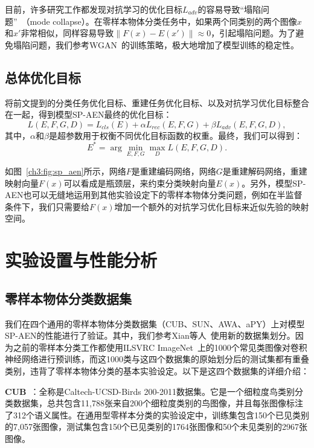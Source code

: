 目前，许多研究工作都发现对抗学习的优化目标$L_{adv}$的容易导致“塌陷问题”~\cite{arjovsky2017wasserstein}（mode collapse）。在零样本物体分类任务中，如果两个同类别的两个图像$x$和$x'$非常相似，同样容易导致$\|F(x)-E(x')\|\approx 0$，引起塌陷问题。为了避免塌陷问题，我们参考WGAN~\cite{arjovsky2017wasserstein}的训练策略，极大地增加了模型训练的稳定性。


\subsection{总体优化目标}
将前文提到的分类任务优化目标、重建任务优化目标、以及对抗学习优化目标整合在一起，得到模型SP-AEN最终的优化目标：
\begin{equation} \label{ch3:eq:eq_5}
L (E, F, G, D) = L_{cls}(E) + \alpha L_{rec} (E, F, G) + \beta L_{adv}(E, F, G, D),
\end{equation}
其中，$\alpha$和$\beta$是超参数用于权衡不同优化目标函数的权重。最终，我们可以得到：
\begin{equation}\label{ch3:eq:eq_6}
E^* = \arg\min\limits_{E, F, G}\max\limits_{D} L(E, F, G, D).
\end{equation}

如图~\ref{ch3:fig:sp_aen}所示，网络$F$是重建编码网络，网络$G$是重建解码网络，重建映射向量$F(x)$可以看成是瓶颈层，来约束分类映射向量$E(x)$。另外，模型SP-AEN也可以无缝地运用到其他实验设定下的零样本物体分类问题，例如在半监督条件下，我们只需要给$F(x)$增加一个额外的对抗学习优化目标来近似先验的映射空间。


\section{实验设置与性能分析}
\subsection{零样本物体分类数据集}

我们在四个通用的零样本物体分类数据集（CUB、SUN、AWA、aPY）上对模型SP-AEN的性能进行了验证。其中，我们参考Xian等人~\cite{xian2017zero}使用新的数据集划分。因为之前的零样本分类工作都使用ILSVRC ImageNet~\cite{russakovsky2015imagenet}上的1000个常见类图像对卷积神经网络进行预训练，而这1000类与这四个数据集的原始划分后的测试集都有重叠类别，违背了零样本物体分类的基本实验设定。以下是这四个数据集的详细介绍：

\textbf{CUB}~\cite{wah2011caltech}：全称是Caltech-UCSD-Birds 200-2011数据集。它是一个细粒度鸟类别分类数据集，总共包含11,788张来自200个细粒度类别的鸟图像，并且每张图像标注了312个语义属性。在通用型零样本分类的实验设定中，训练集包含150个已见类别的7,057张图像，测试集包含150个已见类别的1764张图像和50个未见类别的2967张图像。

